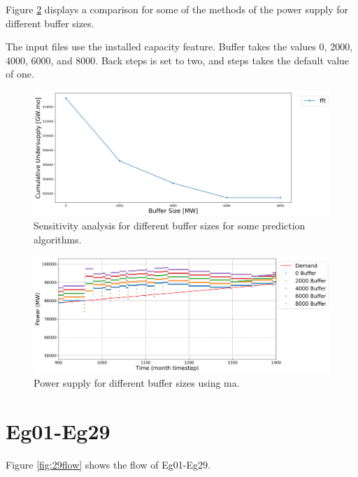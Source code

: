 \documentclass[11pt]{article}
\begin{document}
Figure \ref{fig:24-buf-fft} displays a comparison for some of the methods of the power supply for different buffer sizes.

The input files use the installed capacity feature. Buffer takes the values 0, 2000, 4000, 6000, and 8000. Back steps is set to two, and steps takes the default value of one.

\begin{figure}[H]
	\centering
	\includegraphics[width=\textwidth]{24-figures/24-sens-buffer.png} 
	\hfill
	\caption{Sensitivity analysis for different buffer sizes for some prediction algorithms.}
	\label{fig:24-buff}
\end{figure}

\begin{figure}[H]
	\centering
	\includegraphics[width=\textwidth]{24-figures/24-power-buffer-fft.png} 
	\hfill
	\caption{Power supply for different buffer sizes using ma.}
	\label{fig:24-buf-fft}
\end{figure}

\section{Eg01-Eg29}

Figure \ref{fig:29flow} shows the flow of Eg01-Eg29.
\end{document}
